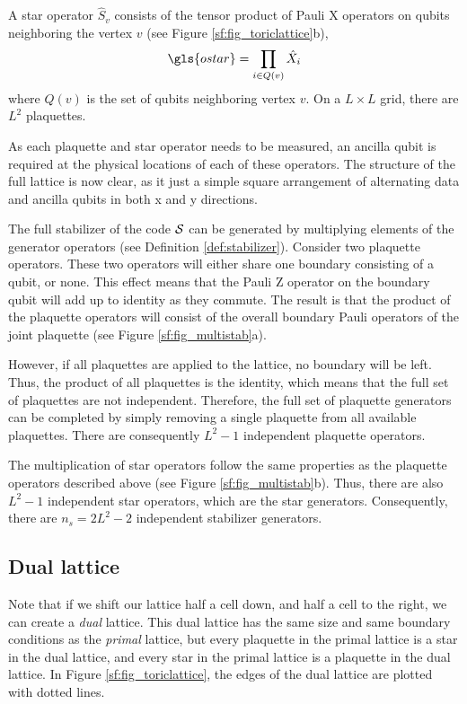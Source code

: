 \begin{definition}
  A star operator $\hat{S}_v$ consists of the tensor product of Pauli X operators on qubits neighboring the vertex $v$ (see Figure \ref{sf:fig_toriclattice}b),
  \begin{equation}\label{eq:sf_star}
    \gls{ostar} = \prod_{i\in Q(v)} \hat{X}_i
  \end{equation}
  where $Q(v)$ is the set of qubits neighboring vertex $v$. On a $L\times L$ grid, there are $L^2$ plaquettes.
\end{definition}

As each plaquette and star operator needs to be measured, an ancilla qubit is required at the physical locations of each of these operators. The structure of the full lattice is now clear, as it just a simple square arrangement of alternating data and ancilla qubits in both x and y directions.

The full stabilizer of the code $\mathcal{S}$ can be generated by multiplying elements of the generator operators (see Definition \ref{def:stabilizer}). Consider two plaquette operators. These two operators will either share one boundary consisting of a qubit, or none. This effect means that the Pauli Z operator on the boundary qubit will add up to identity as they commute. The result is that the product of the plaquette operators will consist of the overall boundary Pauli operators of the joint plaquette (see Figure \ref{sf:fig_multistab}a).

However, if all plaquettes are applied to the lattice, no boundary will be left. Thus, the product of all plaquettes is the identity, which means that the full set of plaquettes are not independent. Therefore, the full set of plaquette generators can be completed by simply removing a single plaquette from all available plaquettes. There are consequently $L^2 - 1$ independent plaquette operators.

The multiplication of star operators follow the same properties as the plaquette operators described above (see Figure \ref{sf:fig_multistab}b). Thus, there are also $L^2 - 1$ independent star operators, which are the star generators. Consequently, there are $n_s = 2L^2 - 2$ independent stabilizer generators.


\subsection{Dual lattice}
Note that if we shift our lattice half a cell down, and half a cell to the right, we can create a \emph{dual} lattice. This dual lattice has the same size and same boundary conditions as the \emph{primal} lattice, but every plaquette in the primal lattice is a star in the dual lattice, and every star in the primal lattice is a plaquette in the dual lattice. In Figure \ref{sf:fig_toriclattice}, the edges of the dual lattice are plotted with dotted lines.

